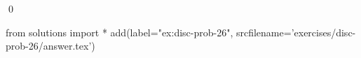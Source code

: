 
\begin{ex} 
  \label{ex:disc-prob-26}
  
  \qed
\end{ex} 
\begin{python0}
from solutions import *
add(label="ex:disc-prob-26",
    srcfilename='exercises/disc-prob-26/answer.tex') 
\end{python0}
